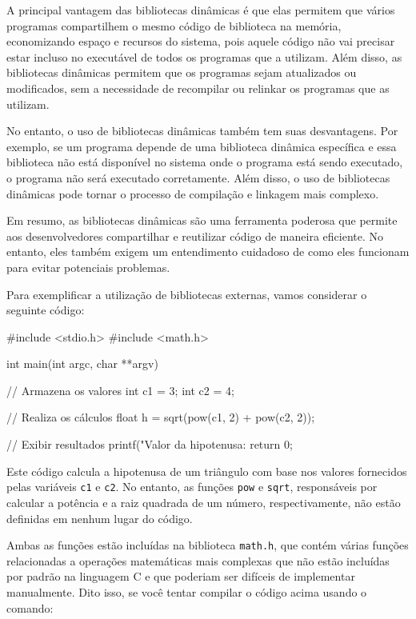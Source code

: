 A principal vantagem das bibliotecas dinâmicas é que elas permitem que vários 
programas compartilhem o mesmo código de biblioteca na memória, economizando 
espaço e recursos do sistema, pois aquele código não vai precisar estar 
incluso no executável de todos os programas que a utilizam. Além disso, as 
bibliotecas dinâmicas permitem que os programas sejam atualizados ou 
modificados, sem a necessidade de recompilar ou relinkar os programas que as 
utilizam.

No entanto, o uso de bibliotecas dinâmicas também tem suas desvantagens. 
Por exemplo, se um programa depende de uma biblioteca dinâmica específica e 
essa biblioteca não está disponível no sistema onde o programa está sendo 
executado, o programa não será executado corretamente. Além disso, o uso de 
bibliotecas dinâmicas pode tornar o processo de compilação e linkagem mais 
complexo.

Em resumo, as bibliotecas dinâmicas são uma ferramenta poderosa que permite 
aos desenvolvedores compartilhar e reutilizar código de maneira eficiente. 
No entanto, eles também exigem um entendimento cuidadoso de como eles 
funcionam para evitar potenciais problemas.

Para exemplificar a utilização de bibliotecas externas, vamos considerar o 
seguinte código:

\begin{excode}
    #include <stdio.h>
    #include <math.h>

    int main(int argc, char **argv)
    {
        // Armazena os valores
        int c1 = 3;
        int c2 = 4;

        // Realiza os cálculos
        float h = sqrt(pow(c1, 2) + pow(c2, 2));

        // Exibir resultados
        printf("Valor da hipotenusa: %
        return 0;
    }
\end{excode}

Este código calcula a hipotenusa de um triângulo com base nos valores fornecidos pelas variáveis \texttt{c1} e \texttt{c2}. No entanto, as funções \texttt{pow} e \texttt{sqrt}, responsáveis por calcular a potência e a raiz quadrada de um número, respectivamente, não estão definidas em nenhum lugar do código.

Ambas as funções estão incluídas na biblioteca \texttt{math.h}, que contém várias funções relacionadas a operações matemáticas mais complexas que não estão incluídas por padrão na linguagem C e que poderiam ser difíceis de implementar manualmente. Dito isso, se você tentar compilar o código acima usando o comando:

